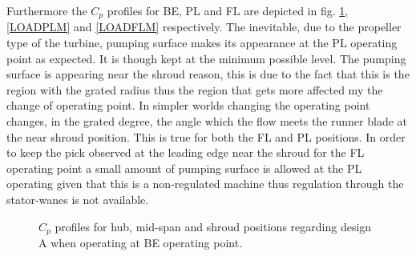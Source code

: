 Furthermore the $C_p$ profiles for BE, PL and FL are depicted in fig. \ref{LOADBEM},\ref{LOADPLM} and \ref{LOADFLM} respectively. The inevitable, due to the propeller type of the turbine, pumping surface makes its appearance at the PL operating point as expected. It is though kept at the minimum possible level. The pumping surface is appearing near the shroud reason, this is due to the fact that this is the region with the grated radius thus the region that gets more affected my the change of operating point. In simpler worlds changing the operating point changes, in the grated degree, the angle which the flow meets the runner blade at the near shroud position. This is true for both the FL and PL positions. In order to keep the pick observed at the leading edge near the shroud for the FL operating point a small amount of pumping surface is allowed at the PL operating given that this is a non-regulated machine thus regulation through the stator-wanes is not available.           


\begin{figure}[h!]
\begin{minipage}[b]{1\linewidth}
 \centering
\end{minipage}
\caption{$C_p$ profiles for hub, mid-span and shroud positions regarding design A when operating at BE operating point.}
\label{LOADBEM}
\end{figure}

